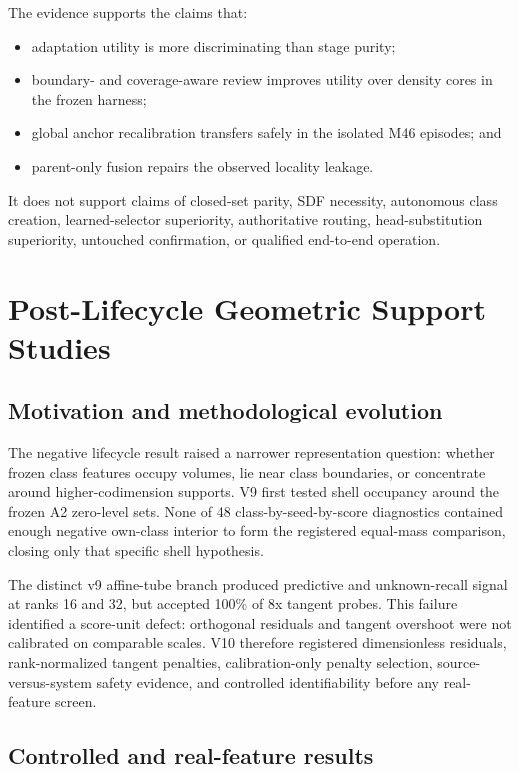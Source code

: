 \documentclass[12pt,oneside]{report}
\begin{document}
The evidence supports the claims that:

\begin{itemize}
\item adaptation utility is more discriminating than stage purity;
\item boundary- and coverage-aware review improves utility over density cores
in the frozen harness;
\item global anchor recalibration transfers safely in the isolated M46
episodes; and
\item parent-only fusion repairs the observed locality leakage.
\end{itemize}

It does not support claims of closed-set parity, SDF necessity, autonomous
class creation, learned-selector superiority, authoritative routing,
head-substitution superiority, untouched confirmation, or qualified
end-to-end operation.

\chapter{Post-Lifecycle Geometric Support Studies}

\section{Motivation and methodological evolution}

The negative lifecycle result raised a narrower representation question:
whether frozen class features occupy volumes, lie near class boundaries, or
concentrate around higher-codimension supports. V9 first tested shell occupancy
around the frozen A2 zero-level sets. None of 48 class-by-seed-by-score
diagnostics contained enough negative own-class interior to form the registered
equal-mass comparison, closing only that specific shell hypothesis.

The distinct v9 affine-tube branch produced predictive and unknown-recall
signal at ranks 16 and 32, but accepted 100\% of 8x tangent probes. This failure
identified a score-unit defect: orthogonal residuals and tangent overshoot were
not calibrated on comparable scales. V10 therefore registered dimensionless
residuals, rank-normalized tangent penalties, calibration-only penalty
selection, source-versus-system safety evidence, and controlled identifiability
before any real-feature screen.

\section{Controlled and real-feature results}
\end{document}
